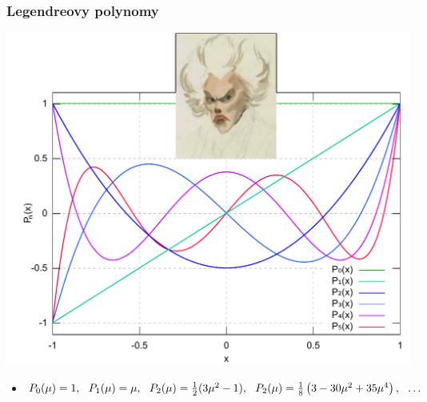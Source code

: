 \begin{frame}
  \frametitle{Legendreovy polynomy}
  \vspace{-1em}
  \centering\includegraphics[height=.8\textheight]{obr/legendre}
  \begin{itemize}
  	\item \footnotesize $\P{0}(\mu) = 1,\ \ \P{1}(\mu) = \mu,\ \ \P{2}(\mu) = \frac12(3\mu^2 - 1),\ \ \P{2}(\mu) = \frac{1}{8} \left(3-30 \mu ^2+35 \mu ^4\right),\ \ \ldots$
  \end{itemize}
\end{frame}

